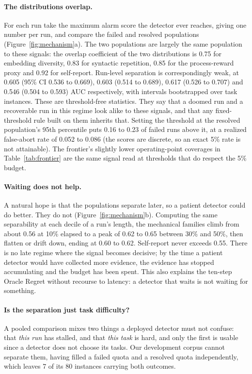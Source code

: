 \documentclass[sigconf,screen]{acmart}
\begin{document}
\paragraph{The distributions overlap.} For each run take the maximum alarm score the detector ever
reaches, giving one number per run, and compare the failed and resolved populations
(Figure~\ref{fig:mechanism}a). The two populations are largely the same population to these
signals: the overlap coefficient of the two distributions is 0.75 for
embedding diversity, 0.83 for syntactic repetition, 0.85 for the process-reward proxy and 0.92 for
self-report. Run-level separation is correspondingly weak, at 0.605 (95\% CI 0.536 to 0.669), 0.603
(0.514 to 0.689), 0.617
(0.526 to 0.707) and 0.546 (0.504 to 0.593) AUC respectively, with intervals bootstrapped over task
instances. These are threshold-free statistics. They say that a doomed run and a recoverable run in
this regime look alike to these signals, and that any fixed-threshold rule built on them inherits
that. Setting the threshold at the resolved population's 95th percentile puts 0.16 to 0.23 of failed
runs above it, at a realized false-abort rate of 0.052 to 0.086 (the scores are discrete, so an
exact 5\% rate is not attainable). The frontier's slightly lower operating-point coverages in
Table~\ref{tab:frontier} are the same signal read at thresholds that do respect the 5\% budget.

\paragraph{Waiting does not help.} A natural hope is that the populations separate later, so a
patient detector could do better. They do not (Figure~\ref{fig:mechanism}b). Computing the same
separability at each decile of a run's length, the mechanical families climb from about 0.56 at 10\%
elapsed to a peak of 0.62 to 0.65 between 30\% and 50\%, then flatten or drift down, ending at 0.60
to 0.62. Self-report never exceeds 0.55. There is no late regime where the signal becomes decisive;
by the time a patient detector would have collected more evidence, the evidence has stopped
accumulating and the budget has been spent. This also explains the ten-step Oracle Regret without
recourse to latency: a detector that waits is not waiting for something.

\paragraph{Is the separation just task difficulty?} A pooled comparison mixes two things a deployed
detector must not confuse: that \emph{this run} has stalled, and that \emph{this task} is hard, and
only the first is usable since a detector does not choose its tasks. Our development corpus cannot
separate them, having filled a failed quota and a resolved quota independently, which leaves 7 of
its 80 instances carrying both outcomes.
\end{document}
